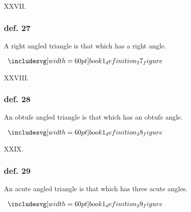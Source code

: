 \hfill

\begin{center}
    XXVII.\label{book1def27}\\
\end{center}
\begin{minipage}{0.67\textwidth}
    \subsubsection{def. 27}
    \begin{center}
        A right angled triangle is that which has a right angle.
    \end{center}
\end{minipage}%
\begin{minipage}{0.33\textwidth}
    \begin{center}
        $\img[0][0][60]{book1_definition_27_figure}$
    \end{center}
\end{minipage}

\hfill

\begin{center}
    XXVIII.\label{book1def28}\\
\end{center}
\begin{minipage}{0.67\textwidth}
    \subsubsection{def. 28}
    \begin{center}
        \raggedright An obtuſe angled triangle is that which has an obtuſe angle.
    \end{center}
\end{minipage}%
\begin{minipage}{0.33\textwidth}
    \begin{center}
        $\img[0][0][60]{book1_definition_28_figure}$
    \end{center}
\end{minipage}

\hfill

\begin{center}
    XXIX.\label{book1def29}\\
\end{center}
\begin{minipage}{0.67\textwidth}
    \subsubsection{def. 29}
    \begin{center}
        \raggedright An acute angled triangle is that which has three acute angles.
    \end{center}
\end{minipage}%
\begin{minipage}{0.33\textwidth}
    \begin{center}
        $\img[0][0][60]{book1_definition_29_figure}$
    \end{center}
\end{minipage}

